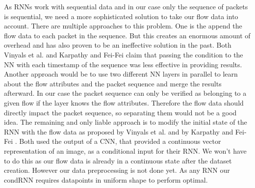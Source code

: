 \documentclass[
	ngerman,
	ruledheaders=section,%
	class=report,%
	thesis={type=bachelor},%
	accentcolor=9c,%
	custommargins=true,%
	marginpar=false,%
	parskip=half-,%
	fontsize=11pt,%
]{tudapub}
\begin{document}
As RNNs work with sequential data and in our case only the sequence of packets is sequential, we need a more sophisticated solution to take our flow data into account.
There are multiple approaches to this problem.
One is the append the flow data to each packet in the sequence.
But this creates an enormous amount of overhead and has also proven to be an ineffective solution in the past.
Both Vinyals et al. \cite{vinyalsShowTellNeural2015} and Karpathy and Fei-Fei \cite{karpathyDeepVisualSemanticAlignments2015} claim that passing the condition to the NN with each timestamp of the sequence was less effective in providing results.
Another approach would be to use two different NN layers in parallel to learn about the flow attributes and the packet sequence and merge the results afterward.
In our case the packet sequence can only be verified as belonging to a given flow if the layer knows the flow attributes.
Therefore the flow data should directly impact the packet sequence, so separating them would not be a good idea.
The remaining and only liable approach is to modify the initial state of the RNN with the flow data as proposed by Vinyals et al. \cite{vinyalsShowTellNeural2015} and by Karpathy and Fei-Fei \cite{karpathyDeepVisualSemanticAlignments2015}.
Both used the output of a CNN, that provided a continuous vector representation of an image, as a conditional input for their RNN.
We won't have to do this as our flow data is already in a continuous state after the dataset creation.
However our data preprocessing is not done yet.
As any RNN our condRNN requires datapoints in uniform shape to perform optimal.
\end{document}

